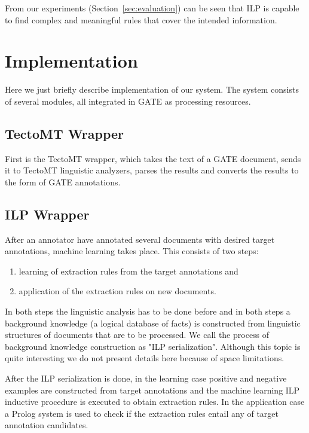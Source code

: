 \documentclass[runningheads,a4paper]{llncs}
\begin{document}
From our experiments (Section~\ref{sec:evaluation}) can be seen that ILP is capable to find complex and meaningful rules that cover the intended information.

%





\section{Implementation}
Here we just briefly describe implementation of our system. The system consists of several modules, all integrated in GATE as processing resources.
\subsection{TectoMT Wrapper}
First is the TectoMT wrapper, which takes the text of a GATE document, sends it to TectoMT linguistic analyzers, parses the results and converts the results to the form of GATE annotations.
\subsection{ILP Wrapper}
After an annotator have annotated several documents with desired target annotations, machine learning takes place. 
This consists of two steps: 
\begin{enumerate}
	\item learning of extraction rules from the target annotations and
	\item application of the extraction rules on new documents.
\end{enumerate}
In both steps the linguistic analysis has to be done before and in both steps a background knowledge (a logical database of facts) is constructed from linguistic structures of documents that are to be processed. We call the process of background knowledge construction as "ILP serialization". Although this topic is quite interesting we do not present details here because of space limitations.

After the ILP serialization is done, in the learning case positive and negative examples are constructed from target annotations and the machine learning ILP inductive procedure is executed to obtain extraction rules.
In the application case a Prolog system is used to check if the extraction rules entail any of target annotation candidates.
\end{document}
